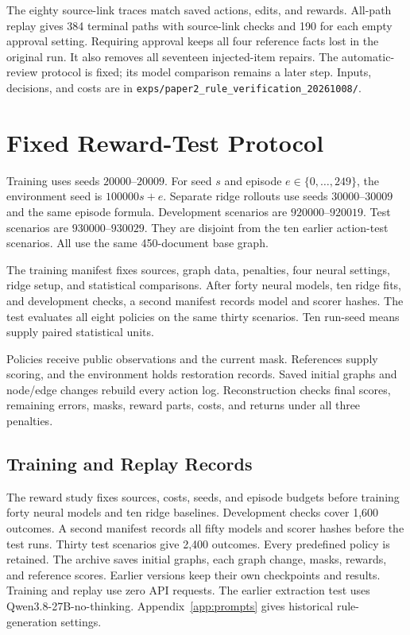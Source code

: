 The eighty source-link traces match saved actions, edits, and rewards.
All-path replay gives 384 terminal paths with source-link checks and
190 for each empty approval setting. Requiring approval keeps all four
reference facts lost in the original run. It also removes all seventeen
injected-item repairs. The automatic-review protocol is fixed;
its model comparison remains a later step. Inputs, decisions, and costs
are in \texttt{exps/paper2\_rule\_verification\_20261008/}.

\section{Fixed Reward-Test Protocol}

\label{app:reward_protocol}

Training uses seeds $20000$--$20009$. For seed $s$ and episode
$e\in\{0,\ldots,249\}$, the environment seed is $100000s+e$.
Separate ridge rollouts use seeds $30000$--$30009$ and the same episode
formula. Development scenarios are $920000$--$920019$.
Test scenarios are $930000$--$930029$. They are disjoint from the ten
earlier action-test scenarios. All use the same 450-document base graph.

The training manifest fixes sources, graph data, penalties, four neural
settings, ridge setup, and statistical comparisons. After forty neural
models, ten ridge fits, and development checks, a second manifest records
model and scorer hashes. The test evaluates all eight policies on the
same thirty scenarios. Ten run-seed means supply paired statistical units.

Policies receive public observations and the current mask.
References supply scoring, and the environment holds restoration records.
Saved initial graphs and node/edge changes rebuild every action log.
Reconstruction checks final scores, remaining errors, masks, reward parts,
costs, and returns under all three penalties.

\subsection{Training and Replay Records}

The reward study fixes sources, costs, seeds, and episode budgets before
training forty neural models and ten ridge baselines.
Development checks cover 1,600 outcomes. A second manifest records all
fifty models and scorer hashes before the test runs. Thirty test
scenarios give 2,400 outcomes. Every predefined policy is retained.
The archive saves initial graphs, each graph change, masks, rewards,
and reference scores. Earlier versions keep their own checkpoints
and results. Training and replay use zero API requests.
The earlier extraction test uses Qwen3.8-27B-no-thinking.
Appendix~\ref{app:prompts} gives historical rule-generation settings.

